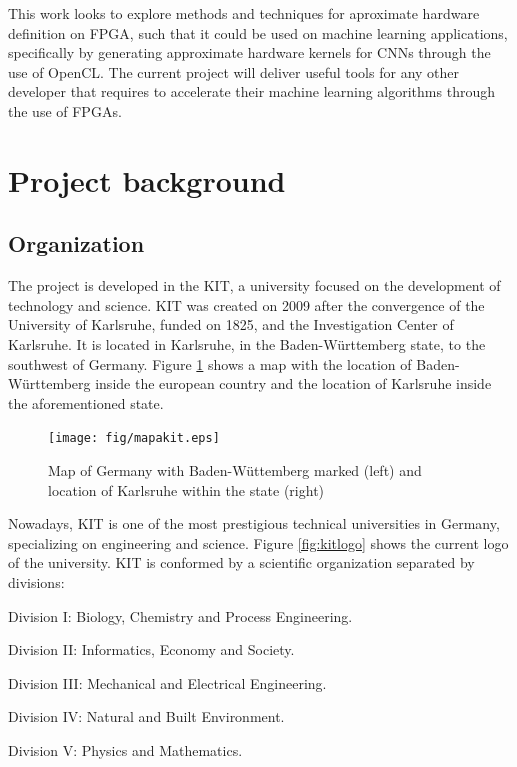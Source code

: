 This work looks to explore methods and techniques for aproximate hardware definition on FPGA, such that
it could be used on machine learning applications, specifically by generating approximate hardware
kernels for CNNs through the use of OpenCL. The current project will deliver useful tools for any 
other developer that requires to accelerate their machine learning algorithms through the use of FPGAs.

\section{Project background}

\subsection{Organization}

The project is developed in the KIT, a university focused on the development of technology and science.
KIT was created on 2009 after the convergence of the University of Karlsruhe, funded on 1825, and the 
Investigation Center of Karlsruhe. It is located in Karlsruhe, in the Baden-Württemberg state, to the
southwest of Germany. Figure \ref{fig:mapakit} shows a map with the location of Baden-Württemberg inside the european
country and the location of Karlsruhe inside the aforementioned state.

\begin{figure}
    \texttt{[image: fig/mapakit.eps]}
    \caption{Map of Germany with Baden-Wüttemberg marked (left) \cite{badenmap} and location of Karlsruhe within the state (right) \cite{karlsmap}}
    \label{fig:mapakit}
\end{figure}

Nowadays, KIT is one of the most prestigious technical universities in Germany, specializing on engineering
and science. Figure \ref{fig:kitlogo} shows the current logo of the university. KIT is conformed by a scientific organization
separated by divisions:

\begin{compactitem}
    \item Division I: Biology, Chemistry and Process Engineering.
    \item Division II: Informatics, Economy and Society.
    \item Division III: Mechanical and Electrical Engineering.
    \item Division IV: Natural and Built Environment.
    \item Division V: Physics and Mathematics.
\end{compactitem}

